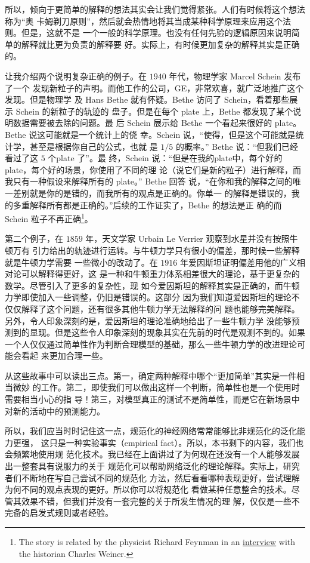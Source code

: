 所以，倾向于更简单的解释的想法其实会让我们觉得紧张。人们有时候将这个想法称为“奥
卡姆剃刀原则”，然后就会热情地将其当成某种科学原理来应用这个法则。但是，这就不是
一个一般的科学原理。也没有任何先验的逻辑原因来说明简单的解释就比更为负责的解释要
好。实际上，有时候更加复杂的解释其实是正确的。

让我介绍两个说明复杂正确的例子。在 $1940$ 年代，物理学家 Marcel Schein 发布了一个
发现新粒子的声明。而他工作的公司，GE，非常欢喜，就广泛地推广这个发现。但是物理学
及 Hans Bethe 就有怀疑。Bethe 访问了 Schein，看着那些展示 Schein 的新粒子的轨迹的
盘子。但是在每个 plate 上，Bethe 都发现了某个说明数据需要被去除的问题。最
后 Schein 展示给 Bethe 一个看起来很好的 plate。Bethe 说这可能就是一个统计上的侥
幸。Schein 说，“使得，但是这个可能就是统计学，甚至是根据你自己的公式，也就
是 $1/5$ 的概率。” Bethe 说：“但我们已经看过了这 $5$ 个plate 了”。最
终，Schein 说：“但是在我的plate中，每个好的plate，每个好的场景，你使用了不同的理
论（说它们是新的粒子）进行解释，而我只有一种假设来解释所有的 plate。” Bethe 回答
说，“在你和我的解释之间的唯一差别就是你的是错的，而我所有的观点是正确的。你单一
的解释是错误的，我的多重解释所有都是正确的。”后续的工作证实了，Bethe 的想法是正
确的而 Schein 粒子不再正确\footnote{The story is related by the physicist
  Richard Feynman in an
  \href{https://www.aip.org/history-programs/niels-bohr-library/oral-histories/5020-4}{interview}
  with the historian Charles Weiner.}。

第二个例子，在 $1859$ 年，天文学家 Urbain Le Verrier 观察到水星并没有按照牛顿万有
引力给出的轨迹进行运转。与牛顿力学只有很小的偏差，那时候一些解释就是牛顿力学需要
一些微小的改动了。在 $1916$ 年爱因斯坦证明偏差用他的广义相对论可以解释得更好，这
是一种和牛顿重力体系相差很大的理论，基于更复杂的数学。尽管引入了更多的复杂性，现
如今爱因斯坦的解释其实是正确的，而牛顿力学即使加入一些调整，仍旧是错误的。这部分
因为我们知道爱因斯坦的理论不仅仅解释了这个问题，还有很多其他牛顿力学无法解释的问
题也能够完美解释。另外，令人印象深刻的是，爱因斯坦的理论准确地给出了一些牛顿力学
没能够预测到的显现。但是这些令人印象深刻的现象其实在先前的时代是观测不到的。如果
一个人仅仅通过简单性作为判断合理模型的基础，那么一些牛顿力学的改进理论可能会看起
来更加合理一些。

从这些故事中可以读出三点。第一，确定两种解释中哪个“更加简单”其实是一件相当微妙
的工作。第二，即使我们可以做出这样一个判断，简单性也是一个使用时需要相当小心的指
导！第三，对模型真正的测试不是简单性，而是它在新场景中对新的活动中的预测能力。

所以，我们应当时时记住这一点，规范化的神经网络常常能够比非规范化的泛化能力更强，
这只是一种实验事实（empirical fact）。所以，本书剩下的内容，我们也会频繁地使用规
范化技术。我已经在上面讲过了为何现在还没有一个人能够发展出一整套具有说服力的关于
规范化可以帮助网络泛化的理论解释。实际上，研究者们不断地在写自己尝试不同的规范化
方法，然后看看哪种表现更好，尝试理解为何不同的观点表现的更好。所以你可以将规范化
看做某种任意整合的技术。尽管其效果不错，但我们并没有一套完整的关于所发生情况的理
解，仅仅是一些不完备的启发式规则或者经验。


